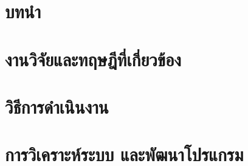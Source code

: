 \documentclass{cskkuproject}
\begin{document}
\maketitlepage

\setcounter{page}{0}
\renewcommand{\thepage}{\ThaiAlph{\value{page}}}

\begin{abstractTH}

\end{abstractTH}

\begin{abstractEN}

\end{abstractEN}

\begin{acknowledgement}

\end{acknowledgement}

\tableofcontents
\clearpage
\listoffigures
\clearpage
\listoftables
\clearpage

\setcounter{page}{1}

\chapter{บทนำ}


\chapter{งานวิจัยและทฤษฎีที่เกี่ยวข้อง}


\chapter{วิธีการดำเนินงาน}


\chapter{การวิเคราะห์ระบบ และพัฒนาโปรแกรม}

\end{document}
